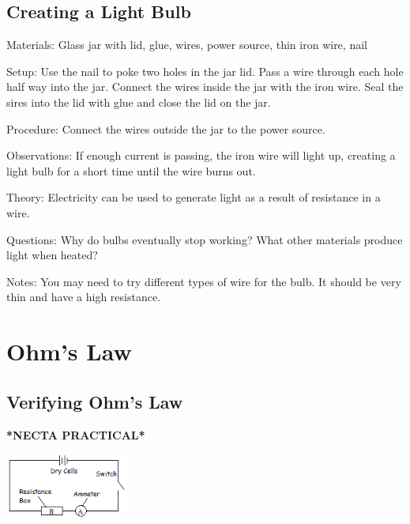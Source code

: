 \begin{multicols}{2}
\subsection{Creating a Light Bulb}


\begin{description*}
\item[Materials:]{Glass jar with lid, glue, wires, power source, thin iron wire, nail}
\item[Setup:]{Use the nail to poke two holes in the jar lid. Pass a wire through each hole half way into the jar. Connect the wires inside the jar with the iron wire. Seal the sires into the lid with glue and close the lid on the jar.}
\item[Procedure:]{Connect the wires outside the jar to the power source.}
\item[Observations:]{If enough current is passing, the iron wire will light up, creating a light bulb for a short time until the wire burns out.}
\item[Theory:]{Electricity can be used to generate light as a result of resistance in a wire.}
\item[Questions:]{Why do bulbs eventually stop working? What other materials produce light when heated?}
\item[Notes:]{You may need to try different types of wire for the bulb. It should be very thin and have a high resistance.}
\end{description*}


\section*{Ohm's Law}


\subsection{Verifying Ohm's Law}
\textbf{*NECTA PRACTICAL*}

\begin{center}
\includegraphics[width=0.3\textwidth]{./img/ohms-law.png}
\end{center}


\end{multicols}

